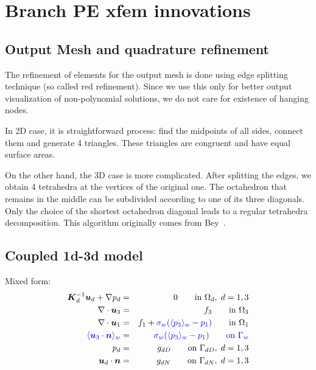 \section{Branch PE xfem innovations}

\subsection{Output Mesh and quadrature refinement}
The refinement of elements for the output mesh is done using edge splitting technique (so called red refinement).
Since we use this only for better output visualization of non-polynomial solutions, we do not
care for existence of hanging nodes.

In 2D case, it is straightforward process: find the midpoints of all sides, connect them and generate 4 triangles.
These triangles are congruent and have equal surface areas.

On the other hand, the 3D case is more complicated. After splitting the edges, we obtain 4 tetrahedra at the vertices
of the original one. The octahedron that remains in the middle can be subdivided according to one of its three diagonals.
Only the choice of the shortest octahedron diagonal leads to a regular tetrahedra decomposition.
This algorithm originally comes from Bey~\cite{}.



\subsection{Coupled 1d-3d model}
Mixed form:
  \begin{eqnarray*}
\mathbf{\boldsymbol{K}}_d^{-1}\mathbf{\boldsymbol{u}}_d + \nabla p_d &=& 0 \qquad \textrm{in } \Omega_d,\; d=1,3  \\
\nabla \cdot \mathbf{\boldsymbol{u}}_3 &=& f_3 \qquad \textrm{in } \Omega_3\\
\nabla \cdot \mathbf{\boldsymbol{u}}_1 &=& f_1 + {\color{blue}\sigma_w(\langle p_3\rangle_w-p_1)}\qquad \textrm{in } \Omega_1\\
\color{blue}\langle\mathbf{\boldsymbol{u}}_3 \cdot \mathbf{\boldsymbol{n}}\rangle_w &=& \color{blue}\sigma_w (\langle p_3\rangle_w - p_{1}) \qquad \textrm{on } \Gamma_w\\
p_d &=& g_{dD} \qquad \textrm{on } \Gamma_{dD},\; d=1,3 \\
\mathbf{\boldsymbol{u}}_d \cdot \mathbf{\boldsymbol{n}} &=& g_{dN} \qquad \textrm{on } \Gamma_{dN},\; d=1,3
  \end{eqnarray*}
  
